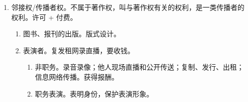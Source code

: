 \begin{enumerate}
\begin{enumerate}
          \item 合作。
                \begin{enumerate}
                  \item 不得阻止除转让、出质、专有许可以外的其他权利行使。
                  \item 可分割的，单独行使。。
                  \item 不可分割的，著作权、物权共同共有。
                \end{enumerate}
          \item 视听制作者。不归制片人，导演署名权，
          \item 职务作品。
                \begin{enumerate}
                  \item 一般职务作品。2 年内单位优先使用、相同方式给别人要经单位同意。
                  \item 特殊职务作品。作者署名权。四图一件、三社两台（媒体）。单位承担责任。
                        工程设计图、产品设计图、地图、示意图、计算机软件。报社、期刊社、通讯社、广播电台、电视台。
                \end{enumerate}
          \item 美术作品。原件转移（获得展览权、发表权）不视为著作权转移。。
          \item 著作权集体管理组织。经授权行使著作权。解决实践中维权难，授权难问题。
                \begin{enumerate}
                  \item 以自己名义主张权利。调解、仲裁、诉讼。
                  \item 收取使用费。协商 \yjt 主管部门裁决 \hz 起诉。
                \end{enumerate}
        \end{enumerate}
  \item 邻接权/传播者权。不属于著作权，叫与著作权有关的权利，是一类传播者的权利。许可 + 付费。
        \begin{enumerate}
          \item 图书、报刊的出版。版式设计。
          \item 表演者。复发租网录直播，要收钱。
                \begin{enumerate}
                  \item 非职务。录音录像；他人现场直播和公开传送；复制、发行、出租；信息网络传播。获得报酬。
                  \item 职务表演。表明身份，保护表演形象。

\end{enumerate}
\end{enumerate}
\end{enumerate}
